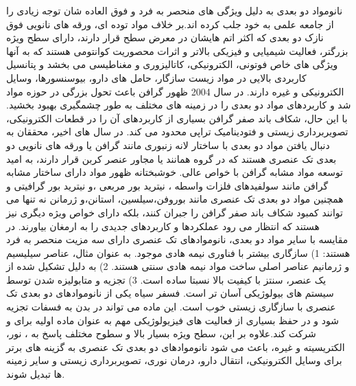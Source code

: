 نانومواد دو بعدی به دلیل ویژگی های منحصر به فرد و فوق العاده شان توجه زیادی را از جامعه علمی به خود جلب کرده اند.\cite{huangGraphenebasedComposites2012, huangGrapheneBasedMaterialsSynthesis2011}بر خلاف مواد توده ای، ورقه های نانویی فوق نازک دو بعدی که اکثر اتم هایشان در معرض سطح قرار دارند، دارای سطح ویژه بزرگتر، فعالیت شیمیایی و فیزیکی بالاتر و اثرات محصوریت کوانتومی هستند که به آنها ویژگی های خاص فوتونی، الکترونیکی، کاتالیزوری و مغناطیسی می بخشد و پتانسیل کاربردی بالایی در مواد زیست سازگار، حامل های دارو، بیوسنسورها، وسایل الکترونیکی و غیره دارند.\cite{lu2DTransitionMetalDichalcogenideNanosheetBasedComposites2016, chhowallaChemistryTwodimensionalLayered2013, sunElectronicStructuresSiC2008} در سال 2004 ظهور گرافن باعث تحول بزرگی در حوزه مواد شد و کاربردهای مواد دو بعدی را در زمینه های مختلف به طور چشمگیری بهبود بخشید. \cite{novoselovElectricFieldEffect2004, geimRiseGraphene2007} با این حال، شکاف باند صفر گرافن بسیاری از کاربردهای آن را در قطعات الکترونیکی، تصویربرداری زیستی و فتودینامیک تراپی محدود می کند. در سال های اخیر، محققان به دنبال یافتن مواد دو بعدی با ساختار لانه زنبوری مانند گرافن یا ورقه های نانویی دو بعدی تک عنصری هستند که در گروه همانند یا مجاور عنصر کربن قرار دارند، به امید توسعه مواد مشابه گرافن با خواص عالی. خوشبختانه ظهور مواد دارای ساختار مشابه گرافن مانند سولفیدهای فلزات واسطه \cite{dingDefectEngineeredBioactive2019, liRatiometricImmunoassaysBuilt2019}، نیترید بور مربعی \cite{deanBoronNitrideSubstrates2010}،و نیترید بور گرافیتی \cite{caoPolymericPhotocatalystsBased2015}و همچنین مواد دو بعدی تک عنصری مانند بوروفن\cite{fengExperimentalRealizationTwodimensional2016}،سیلسین\cite{fengEvidenceSiliceneHoneycomb2012,chenEvidenceDiracFermions2012,duTuningBandGap2014}، استانن\cite{gouStraininducedBandEngineering2017, zhuEpitaxialGrowthTwodimensional2015}،و ژرمانن \cite{niTunableBandgapSilicene2012} نه تنها می توانند کمبود شکاف باند صفر گرافن را جبران کنند، بلکه دارای خواص ویژه دیگری نیز هستند که انتظار می رود عملکردها و کاربردهای جدیدی را به ارمغان بیاورند. در مقایسه با سایر مواد دو بعدی، نانوموادهای تک عنصری دارای سه مزیت منحصر به فرد هستند: 1) سازگاری بیشتر با فناوری نیمه هادی موجود. به عنوان مثال، عناصر سیلیسیم و ژرمانیم عناصر اصلی ساخت مواد نیمه هادی سنتی هستند. 2) به دلیل تشکیل شده از یک عنصر، سنتز با کیفیت بالا نسبتا ساده است. 3) تجزیه و متابولیزه شدن توسط سیستم های بیولوژیکی آسان تر است. فسفر سیاه یکی از نانوموادهای دو بعدی تک عنصری با سازگاری زیستی خوب است. این ماده می تواند در بدن به فسفات تجزیه شود و در حفظ بسیاری از فعالیت های فیزیولوژیکی مهم به عنوان ماده اولیه برای  و  شرکت کند.\cite{shaoBiodegradableBlackPhosphorusbased2016,taoBlackPhosphorusNanosheets2017}علاوه بر این، سطح ویژه بسیار بالا و سطوح مختلف پاسخ به ، نور، الکتریسیته و غیره، باعث می شود نانوموادهای دو بعدی تک عنصری به گزینه های برتر برای وسایل الکترونیکی، انتقال دارو، درمان نوری، تصویربرداری زیستی و سایر زمینه ها تبدیل شوند. \cite{liEngineeredFunctionalized2D2020,shiPHSensitiveNanoscaleMaterials2020}

